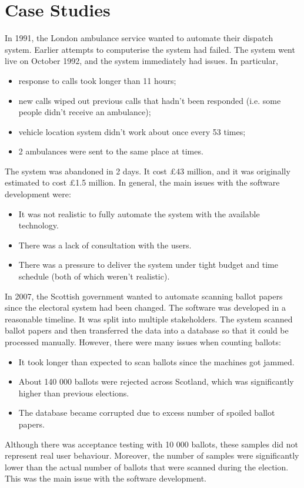 \documentclass[a4paper, openany]{memoir}
\begin{document}
\section{Case Studies}
In 1991, the London ambulance service wanted to automate their dispatch system. Earlier attempts to computerise the system had failed. The system went live on October 1992, and the system immediately had issues. In particular,
\begin{itemize}
    \item response to calls took longer than 11 hours;
    \item new calls wiped out previous calls that hadn't been responded (i.e. some people didn't receive an ambulance);
    \item vehicle location system didn't work about once every 53 times;
    \item 2 ambulances were sent to the same place at times.
\end{itemize}
The system was abandoned in 2 days. It cost £43 million, and it was originally estimated to cost £1.5 million. In general, the main issues with the software development were:
\begin{itemize}
    \item It was not realistic to fully automate the system with the available technology.
    \item There was a lack of consultation with the users.
    \item There was a pressure to deliver the system under tight budget and time schedule (both of which weren't realistic).
\end{itemize}

In 2007, the Scottish government wanted to automate scanning ballot papers since the electoral system had been changed. The software was developed in a reasonable timeline. It was split into multiple stakeholders. The system scanned ballot papers and then transferred the data into a database so that it could be processed manually. However, there were many issues when counting ballots:
\begin{itemize}
    \item It took longer than expected to scan ballots since the machines got jammed.
    \item About 140 000 ballots were rejected across Scotland, which was significantly higher than previous elections.
    \item The database became corrupted due to excess number of spoiled ballot papers.
\end{itemize}
Although there was acceptance testing with 10 000 ballots, these samples did not represent real user behaviour. Moreover, the number of samples were significantly lower than the actual number of ballots that were scanned during the election. This was the main issue with the software development.
\end{document}
